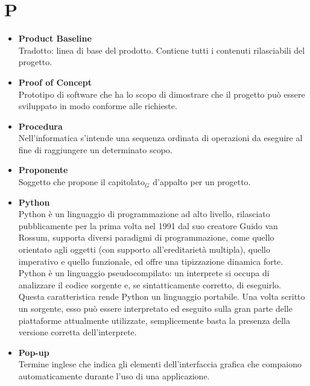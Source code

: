 \chapter{P} \label{P}
	\begin{itemize}
		\item \textbf{Product Baseline}\\
		Tradotto: linea di base del prodotto.
		Contiene tutti i contenuti rilasciabili del progetto.
		
		\item \textbf{Proof of Concept}\\
		Prototipo di software che ha lo scopo di dimostrare che il progetto può essere sviluppato in modo conforme alle richieste.
		
		\item \textbf{Procedura}\\
		Nell'informatica s'intende una sequenza ordinata di operazioni da eseguire al fine di raggiungere un determinato scopo.

		\item \textbf{Proponente}\\
		Soggetto che propone il capitolato$_G$ d'appalto per un progetto.
		
		\item \textbf{Python}\\
		Python è un linguaggio di programmazione ad alto livello, rilasciato pubblicamente per la prima volta nel 1991 dal suo creatore Guido van Rossum, supporta diversi paradigmi di programmazione, come quello orientato agli oggetti (con supporto all'ereditarietà multipla), quello imperativo e quello funzionale, ed offre una tipizzazione dinamica forte.
		Python è un linguaggio pseudocompilato: un interprete si occupa di analizzare il codice sorgente e, se sintatticamente corretto, di eseguirlo. Questa caratteristica rende Python un linguaggio portabile. Una volta scritto un sorgente, esso può essere interpretato ed eseguito sulla gran parte delle piattaforme attualmente utilizzate, semplicemente basta la presenza della versione corretta dell’interprete.
		
		\item \textbf{Pop-up}\\
		Termine inglese che indica gli elementi dell'interfaccia grafica che compaiono automaticamente durante l'uso di una applicazione.
	\end{itemize}